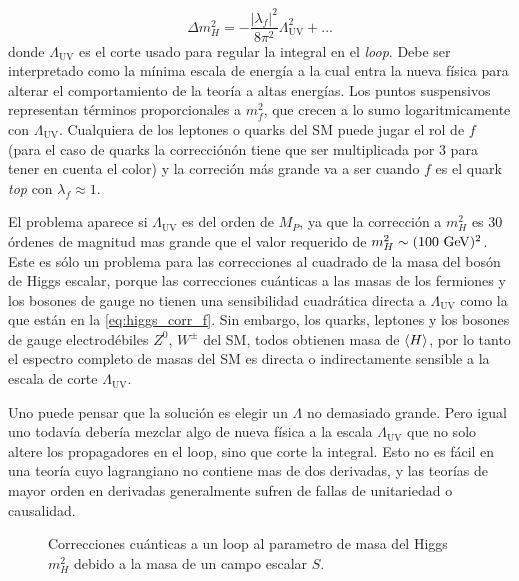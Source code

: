 \begin{equation}
  \Delta m_H^2 = -\frac{|\lambda_f|^2}{8\pi^2} \Lambda^2_\text{UV} + \ldots
  \label{eq:higgs_corr_f}
\end{equation}
%
donde $\Lambda_\text{UV}$ es el corte usado para regular la integral en el
\emph{loop}. Debe ser interpretado como la m\'inima escala de energ\'ia a la
cual entra la nueva física para alterar el comportamiento de la teoría a altas
energías. Los puntos suspensivos representan términos proporcionales a $m_f^2$,
que crecen a lo sumo logaritmicamente con $\Lambda_\text{UV}$. Cualquiera de los
leptones o quarks del SM puede jugar el rol de $f$ (para el caso de quarks la
correcciónón tiene que ser multiplicada por 3 para tener en cuenta el color) y
la correción m\'as grande va a ser cuando $f$ es el quark \emph{top} con
$\lambda_f \approx 1$.

El problema aparece si $\Lambda_\text{UV}$ es del orden de $M_P$, ya que la
corrección a $m_H^2$ es 30 órdenes de magnitud mas grande que el valor requerido
de $m_H^2 \sim (100 \gev)^2$. Este es sólo un problema para las correcciones al
cuadrado de la masa del bosón de Higgs escalar, porque las correcciones
cuánticas a las masas de los fermiones y los bosones de gauge no tienen una
sensibilidad cuadrática directa a $\Lambda_\text{UV}$ como la que están en la
\cref{eq:higgs_corr_f}. Sin embargo, los quarks, leptones y los bosones de gauge
electrodébiles $Z^0$, $W^{\pm}$ del SM, todos obtienen masa de $\langle H \rangle$, por
lo tanto el espectro completo de masas del SM es directa o indirectamente
sensible a la escala de corte $\Lambda_\text{UV}$.

Uno puede pensar que la solución es elegir un $\Lambda$ no demasiado grande.
Pero igual uno todavía debería mezclar algo de nueva física a la escala
$\Lambda_\text{UV}$ que no solo altere los propagadores en el loop, sino que
corte la integral. Esto no es fácil en una teoría cuyo lagrangiano no contiene
mas de dos derivadas, y las teorías de mayor orden en derivadas generalmente
sufren de fallas de unitariedad o causalidad.

\begin{figure}[!htbp]
  \centering 
  \caption{Correcciones cuánticas a un loop al parametro de masa del Higgs
    $m_H^2$ debido a la masa de un campo escalar $S$.}
  \label{fig:higgs_correction_s}
\end{figure}

